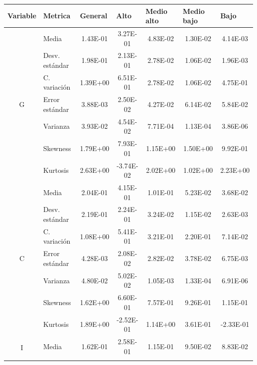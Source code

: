 \documentclass[conference]{IEEEtran}
\begin{document}
\begin{table}[H]
    \tiny
    \centering
    \begin{tabular}{|c|l|c|c|c|c|c|}
\hline
\multicolumn{1}{|l|}{Variable} &
  Metrica &
  \multicolumn{1}{l|}{General} &
  \multicolumn{1}{l|}{Alto} &
  \multicolumn{1}{l|}{Medio alto} &
  \multicolumn{1}{l|}{Medio bajo} &
  \multicolumn{1}{l|}{Bajo} \\ \hline
\multirow{7}{*}{G}   & Media          & 1.43E-01  & 3.27E-01  & 4.83E-02  & 1.30E-02 & 4.14E-03  \\ \cline{2-7} 
                     & Desv. estándar & 1.98E-01  & 2.13E-01  & 2.78E-02  & 1.06E-02 & 1.96E-03  \\ \cline{2-7} 
                     & C. variación   & 1.39E+00  & 6.51E-01  & 2.78E-02  & 1.06E-02 & 4.75E-01  \\ \cline{2-7} 
                     & Error estándar & 3.88E-03  & 2.50E-02  & 4.27E-02  & 6.14E-02 & 5.84E-02  \\ \cline{2-7} 
                     & Varianza       & 3.93E-02  & 4.54E-02  & 7.71E-04  & 1.13E-04 & 3.86E-06  \\ \cline{2-7} 
                     & Skewness       & 1.79E+00  & 7.93E-01  & 1.15E+00  & 1.50E+00 & 9.92E-01  \\ \cline{2-7} 
                     & Kurtosis       & 2.63E+00  & -3.74E-02 & 2.02E+00  & 1.02E+00 & 2.23E+00  \\ \hline
\multirow{7}{*}{C}   & Media          & 2.04E-01  & 4.15E-01  & 1.01E-01  & 5.23E-02 & 3.68E-02  \\ \cline{2-7} 
                     & Desv. estándar & 2.19E-01  & 2.24E-01  & 3.24E-02  & 1.15E-02 & 2.63E-03  \\ \cline{2-7} 
                     & C. variación   & 1.08E+00  & 5.41E-01  & 3.21E-01  & 2.20E-01 & 7.14E-02  \\ \cline{2-7} 
                     & Error estándar & 4.28E-03  & 2.08E-02  & 2.82E-02  & 3.78E-02 & 6.75E-03  \\ \cline{2-7} 
                     & Varianza       & 4.80E-02  & 5.02E-02  & 1.05E-03  & 1.33E-04 & 6.91E-06  \\ \cline{2-7} 
                     & Skewness       & 1.62E+00  & 6.60E-01  & 7.57E-01  & 9.26E-01 & 1.15E-01  \\ \cline{2-7} 
                     & Kurtosis       & 1.89E+00  & -2.52E-01 & 1.14E+00  & 3.61E-01 & -2.33E-01 \\ \hline
\multirow{7}{*}{I}   & Media          & 1.62E-01  & 2.58E-01  & 1.15E-01  & 9.50E-02 & 8.83E-02  \\ \cline{2-7} 

\end{tabular}
\end{table}
\end{document}
